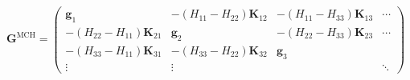 \documentclass{article}
\renewcommand{\vec}[1]{\ensuremath{\mathbf{#1}}}
\begin{document}
  \begin{equation}
    \vec{G}^{\text{MCH}}=
    \begin{pmatrix}
      \vec{g}_1   &-(H_{11}-H_{22})\vec{K}_{12} &-(H_{11}-H_{33})\vec{K}_{13} &\cdots\nonumber\\
      -(H_{22}-H_{11})\vec{K}_{21}      &\vec{g}_2      &-(H_{22}-H_{33})\vec{K}_{23}&\cdots\nonumber\\
      -(H_{33}-H_{11})\vec{K}_{31}      &-(H_{33}-H_{22})\vec{K}_{32} &\vec{g}_3\nonumber\\
      \vdots      &\vdots         &       &\ddots
    \end{pmatrix}
\nonumber  \end{equation}
\end{document}
